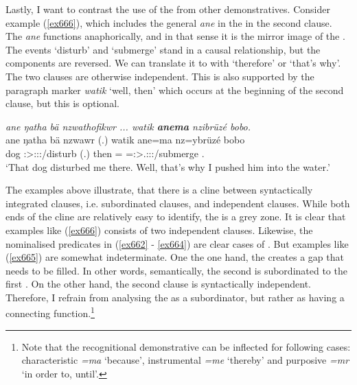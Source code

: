 Lastly, I want to contrast the use of the  from other demonstratives. Consider example (\ref{ex666}), which includes the general  \emph{ane} in the   in the second clause. The  \emph{ane} functions anaphorically, and in that sense it is the mirror image of the . The events `disturb' and `submerge' stand in a causal relationship, but the components are reversed. We can translate it to  with `therefore' or `that's why'. The two clauses are otherwise independent. This is also supported by the paragraph marker \emph{watik} `well, then' which occurs at the beginning of the second clause, but this is optional.

\begin{exe}
	\ex \emph{ane ŋatha bä nzwathofikwr ... watik \textbf{anema} nzibrüzé bobo.}\\
	\gll ane ŋatha bä nzwawr (.) watik ane=ma nz=ybrüzé bobo\\
	\Dem{} dog \Med{} \Stsg:\Sbj>\Fsg:\Obj:\Rpst:\Ipfv/disturb (.) then \Dem=\Char{} \Immpst=\Fsg:\Sbj>\Stsg.\Masc:\Obj:\Nonpast:\Ipfv/submerge \Med.\All{}\\
	\trans `That dog disturbed me there. Well, that's why I pushed him into the water.'
	\label{ex666}
\end{exe}

The examples above illustrate, that there is a cline between syntactically integrated clauses, i.e. subordinated clauses, and independent clauses. While both ends of the cline are relatively easy to identify, the  is a grey zone. It is clear that examples like (\ref{ex666}) consists of two independent clauses. Likewise, the nominalised predicates in (\ref{ex662} - \ref{ex664}) are clear cases of . But examples like (\ref{ex665}) are somewhat indeterminate. One the one hand, the   creates a gap that needs to be filled. In other words, semantically, the second  is subordinated to the first . On the other hand, the second clause is syntactically independent. Therefore, I refrain from analysing the  as a subordinator, but rather as having a connecting function.\footnote{Note that the recognitional demonstrative can be inflected for following cases: characteristic \emph{=ma} `because', instrumental \emph{=me} `thereby' and purposive \emph{=mr} `in order to, until'.}%

